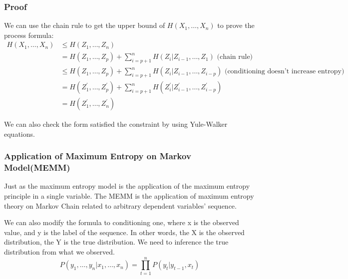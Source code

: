 \documentclass[12pt, a4paper]{article}
\begin{document}
\subsubsection{Proof}
We can use the chain rule to get the upper bound of $H\left(X_{1}, \ldots, X_{n}\right)$ to prove the process formula:
\begin{equation}
	\begin{aligned}
	H\left(X_{1}, \ldots, X_{n}\right) & \leq H\left(Z_{1}, \ldots, Z_{n}\right) \\
	&=H\left(Z_{1}, \ldots, Z_{p}\right)+\sum_{i=p+1}^{n} H\left(Z_{i} | Z_{i-1}, \ldots, Z_{1}\right) \text { (chain rule) }\\
	&\leq H\left(Z_{1}, \ldots, Z_{p}\right)+\sum_{i=p+1}^{n} H\left(Z_{i} | Z_{i-1}, \ldots, Z_{i-p}\right) \text { (conditioning doesn't increase entropy) }\\
	&=H\left(Z_{1}^{\prime}, \ldots, Z_{p}^{\prime}\right)+\sum_{i=p+1}^{n} H\left(Z_{i}^{\prime} | Z_{i-1}^{\prime}, \ldots, Z_{i-p}^{\prime}\right)\\
	&=H\left(Z_{1}^{\prime}, \ldots, Z_{n}^{\prime}\right)
	\end{aligned}
\end{equation}

We can also check the form satisfied the constraint by using Yule-Walker equations.

\subsubsection{Application of Maximum Entropy on Markov Model(MEMM)}
Just as the maximum entropy model is the application of the maximum entropy principle in a single variable. The MEMM \cite{mccallum2000maximum} is the application of maximum entropy theory on Markov Chain related to arbitrary dependent variables' sequence.

We can also modify the formula to conditioning one, where x is the observed value, and y is the label of the sequence.  In other words, the X is the observed distribution, the Y is the true distribution. We need to inference the true distribution from what we observed.
\begin{equation}
P\left(y_{1}, \ldots, y_{n} | x_{1}, \ldots, x_{n}\right)=\prod_{t=1}^{n} P\left(y_{t} | y_{t-1}, x_{t}\right)
\end{equation}
\end{document}
